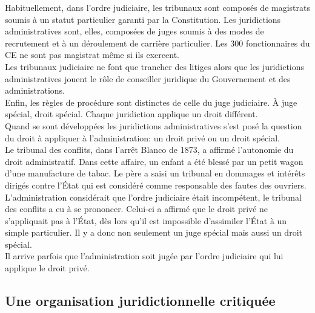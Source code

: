 \documentclass[12pt, a4paper, openany]{book}
\begin{document}
Habituellement, dans l'ordre judiciaire, les tribunaux sont composés de magistrats soumis à un statut particulier garanti par la Constitution. Les juridictions administratives sont, elles, composées de juges soumis à des modes de recrutement et à un déroulement de carrière particulier. Les 300 fonctionnaires du CE ne sont pas magistrat même si ils exercent. \\
Les tribunaux judiciaire ne font que trancher des litiges alors que les juridictions administratives jouent le rôle de conseiller juridique du Gouvernement et des administrations. \\
Enfin, les règles de procédure sont distinctes de celle du juge judiciaire. À juge spécial, droit spécial. Chaque juridiction applique un droit différent. \\
Quand se sont développées les juridictions administratives s'est posé la question du droit à appliquer à l'administration: un droit privé ou un droit spécial. \\ 
Le tribunal des conflits, dans l'arrêt Blanco de 1873, a affirmé l'autonomie du droit administratif. Dans cette affaire, un enfant a été blessé par un petit wagon d'une manufacture de tabac. Le père a saisi un tribunal en dommages et intérêts dirigés contre l'État qui est considéré comme responsable des fautes des ouvriers. L'administration considérait que l'ordre judiciaire était incompétent, le tribunal des conflits a eu à se prononcer. Celui-ci a affirmé que le droit privé ne s'appliquait pas à l'État, dès lors qu'il est impossible d'assimiler l'État à un simple particulier. Il y a donc non seulement un juge spécial mais aussi un droit spécial. \\
Il arrive parfois que l'administration soit jugée par l'ordre judiciaire qui lui applique le droit privé. 


\subsection{Une organisation juridictionnelle critiquée}
\end{document}
